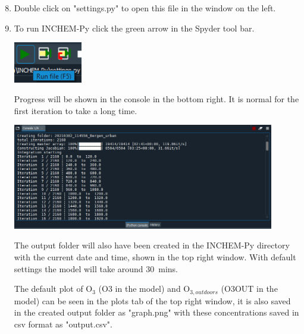 \documentclass[a4paper]{refart}
\begin{document}
\newpage
{\hspace*{-\leftmarginwidth}
\begin{minipage}{\fullwidth}
\linespread{2.0}\selectfont
\begin{enumerate}
\setcounter{enumi}{7}
    \item Double click on "settings.py" to open this file in the window on the left.
    \item To run INCHEM-Py click the green arrow in the Spyder tool bar.

            \vspace{1em}
            \begin{minipage}[t]{\linewidth}
                \centering
                \includegraphics[width = 3cm]{run.png}
            \end{minipage}

          Progress will be shown in the console in the bottom right. It is normal for the first iteration to take a long time.

            \vspace{1em}
            \begin{minipage}[t]{\linewidth}
                \centering
                \includegraphics[width = 0.9\textwidth]{progress.png}
            \end{minipage}

          The output folder will also have been created in the INCHEM-Py directory with the current date and time, shown in the top right window. With default settings the model will take around 30~mins.

          The default plot of O$_3$ (O3 in the model) and O$_{3,outdoors}$ (O3OUT in the model) can be seen in the plots tab of the top right window, it is also saved in the created output folder as "graph.png" with these concentrations saved in csv format as "output.csv".


\end{enumerate}
\end{minipage}}
\end{document}
